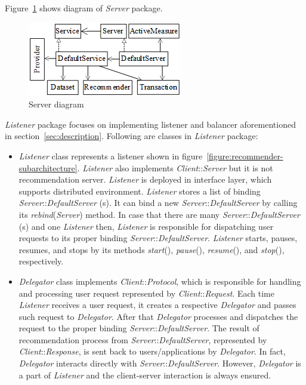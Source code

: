\documentclass[a4paper,twoside]{article}
\begin{document}
Figure~\ref{figure:server-diagram} shows diagram of \textit{Server} package.
\begin{figure}
\centering
\includegraphics{ServerDiagram.png}
\caption{Server diagram}
\label{figure:server-diagram}
\end{figure}

\textit{Listener} package focuses on implementing listener and balancer aforementioned in section~\ref{sec:description}. Following are classes in \textit{Listener} package:
\begin{itemize}
\item \textit{Listener} class represents a listener shown in figure~\ref{figure:recommender-subarchitecture}. \textit{Listener} also implements \textit{Client}::\textit{Server} but it is not recommendation server. \textit{Listener} is deployed in interface layer, which supports distributed environment. \textit{Listener} stores a list of binding \textit{Server}::\textit{DefaultServer} (s). It can bind a new \textit{Server}::\textit{DefaultServer} by calling its \textit{rebind}(\textit{Server}) method. In case that there are many \textit{Server}::\textit{DefaultServer} (s) and one \textit{Listener} then, \textit{Listener} is responsible for dispatching user requests to its proper binding \textit{Server}::\textit{DefaultServer}. \textit{Listener} starts, pauses, resumes, and stops by its methods \textit{start}(), \textit{pause}(), \textit{resume}(), and \textit{stop}(), respectively.

\item \textit{Delegator} class implements \textit{Client}::\textit{Protocol}, which is responsible for handling and processing user request represented by \textit{Client}::\textit{Request}. Each time \textit{Listener} receives a user request, it creates a respective \textit{Delegator} and passes such request to \textit{Delegator}. After that \textit{Delegator} processes and dispatches the request to the proper binding \textit{Server}::\textit{DefaultServer}. The result of recommendation process from \textit{Server}::\textit{DefaultServer}, represented by \textit{Client}::\textit{Response}, is sent back to users/applications by \textit{Delegator}. In fact, \textit{Delegator} interacts directly with \textit{Server}::\textit{DefaultServer}. However, \textit{Delegator} is a part of \textit{Listener} and the client-server interaction is always ensured.


\end{itemize}
\end{document}
